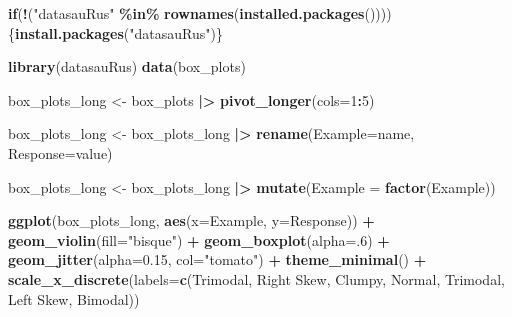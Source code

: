 \documentclass[
  10pt,
  letterpaper,
  twoside,
  openright]{book}
\newenvironment{Shaded}{\begin{snugshade}}{\end{snugshade}}
\newcommand{\AttributeTok}[1]{\textcolor[rgb]{0.13,0.29,0.53}{#1}}
\newcommand{\ControlFlowTok}[1]{\textcolor[rgb]{0.13,0.29,0.53}{\textbf{#1}}}
\newcommand{\DecValTok}[1]{\textcolor[rgb]{0.00,0.00,0.81}{#1}}
\newcommand{\FloatTok}[1]{\textcolor[rgb]{0.00,0.00,0.81}{#1}}
\newcommand{\FunctionTok}[1]{\textcolor[rgb]{0.13,0.29,0.53}{\textbf{#1}}}
\newcommand{\NormalTok}[1]{#1}
\newcommand{\OtherTok}[1]{\textcolor[rgb]{0.56,0.35,0.01}{#1}}
\newcommand{\SpecialCharTok}[1]{\textcolor[rgb]{0.81,0.36,0.00}{\textbf{#1}}}
\newcommand{\StringTok}[1]{\textcolor[rgb]{0.31,0.60,0.02}{#1}}
\begin{document}
\begin{Shaded}
\begin{Highlighting}[]
\ControlFlowTok{if}\NormalTok{(}\SpecialCharTok{!}\NormalTok{(}\StringTok{"datasauRus"} \SpecialCharTok{\%in\%} \FunctionTok{rownames}\NormalTok{(}\FunctionTok{installed.packages}\NormalTok{())))\{}\FunctionTok{install.packages}\NormalTok{(}\StringTok{"datasauRus"}\NormalTok{)\}}

\FunctionTok{library}\NormalTok{(datasauRus)}
\FunctionTok{data}\NormalTok{(box\_plots)}

\NormalTok{box\_plots\_long }\OtherTok{\textless{}{-}}\NormalTok{ box\_plots }\SpecialCharTok{|\textgreater{}}
  \FunctionTok{pivot\_longer}\NormalTok{(}\AttributeTok{cols=}\DecValTok{1}\SpecialCharTok{:}\DecValTok{5}\NormalTok{)}
  
\NormalTok{box\_plots\_long }\OtherTok{\textless{}{-}}\NormalTok{ box\_plots\_long }\SpecialCharTok{|\textgreater{}}
  \FunctionTok{rename}\NormalTok{(}\AttributeTok{Example=}\NormalTok{name, }\AttributeTok{Response=}\NormalTok{value)}

\NormalTok{box\_plots\_long }\OtherTok{\textless{}{-}}\NormalTok{ box\_plots\_long }\SpecialCharTok{|\textgreater{}} 
  \FunctionTok{mutate}\NormalTok{(}\AttributeTok{Example =} \FunctionTok{factor}\NormalTok{(Example))}

\FunctionTok{ggplot}\NormalTok{(box\_plots\_long, }\FunctionTok{aes}\NormalTok{(}\AttributeTok{x=}\NormalTok{Example, }\AttributeTok{y=}\NormalTok{Response)) }\SpecialCharTok{+}
  \FunctionTok{geom\_violin}\NormalTok{(}\AttributeTok{fill=}\StringTok{"bisque"}\NormalTok{) }\SpecialCharTok{+}
  \FunctionTok{geom\_boxplot}\NormalTok{(}\AttributeTok{alpha=}\NormalTok{.}\DecValTok{6}\NormalTok{) }\SpecialCharTok{+}
  \FunctionTok{geom\_jitter}\NormalTok{(}\AttributeTok{alpha=}\FloatTok{0.15}\NormalTok{, }\AttributeTok{col=}\StringTok{"tomato"}\NormalTok{) }\SpecialCharTok{+}
  \FunctionTok{theme\_minimal}\NormalTok{() }\SpecialCharTok{+} 
  \FunctionTok{scale\_x\_discrete}\NormalTok{(}\AttributeTok{labels=}\FunctionTok{c}\NormalTok{(}\StringTok{\textquotesingle{}Trimodal, Right Skew\textquotesingle{}}\NormalTok{, }\StringTok{\textquotesingle{}Clumpy\textquotesingle{}}\NormalTok{, }\StringTok{\textquotesingle{}Normal\textquotesingle{}}\NormalTok{, }
                            \StringTok{\textquotesingle{}Trimodal, Left Skew\textquotesingle{}}\NormalTok{,  }\StringTok{\textquotesingle{}Bimodal\textquotesingle{}}\NormalTok{))}
\end{Highlighting}
\end{Shaded}
\end{document}
